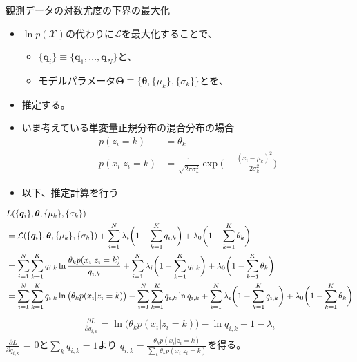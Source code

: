 \documentclass[aspectratio=169,unicode,dvipdfmx,14pt]{beamer}
\begin{document}
\begin{frame}{観測データの対数尤度の下界の最大化}
\begin{itemize}
\item $\ln p(\mathcal{X})$の代わりに$\mathcal{L}$を最大化することで、
\begin{itemize}
\item $\{ \bm{q}_i \} \equiv \{ \bm{q}_1, \ldots, \bm{q}_N \}$と、
\item モデルパラメータ$\bm{\Theta} \equiv \{ \bm{\theta}, \{ \mu_k \}, \{ \sigma_k \} \}$とを、
\end{itemize}
\item[] 推定する。
\item いま考えている単変量正規分布の混合分布の場合
\begin{align}
p(z_i=k) & = \theta_k \\
p(x_i | z_i=k) & = \frac{1}{\sqrt{2\pi\sigma_k^2}} \exp \bigg( - \frac{ ( x_i - \mu_k)^2 }{ 2\sigma_k^2 } \bigg)
\end{align}
\item 以下、推定計算を行う
\end{itemize}
\end{frame}

\begin{frame}
\FontMath
\begin{align}
& L(\{ \bm{q}_i \},\bm{\theta},\{\mu_k\},\{\sigma_k\}) 
\notag \\ &
= \mathcal{L}(\{ \bm{q}_i \},\bm{\theta},\{\mu_k\},\{\sigma_k\})
+ \sum_{i=1}^N \lambda_i \bigg(1 - \sum_{k=1}^K q_{i,k}\bigg)
+ \lambda_0 \bigg( 1 - \sum_{k=1}^K \theta_k \bigg)
\notag \\ &
= \sum_{i=1}^N \sum_{k=1}^K q_{i,k} \ln\frac{\theta_k p(x_i | z_i = k)}{q_{i,k}}
+ \sum_{i=1}^N \lambda_i \bigg(1 - \sum_{k=1}^K q_{i,k}\bigg)
+ \lambda_0 \bigg( 1 - \sum_{k=1}^K \theta_k \bigg)
\notag \\ &
= 
\sum_{i=1}^N \sum_{k=1}^K q_{i,k} \ln \big( \theta_k p(x_i | z_i = k) \big)
- \sum_{i=1}^N \sum_{k=1}^K q_{i,k} \ln q_{i,k}
+ \sum_{i=1}^N \lambda_i \bigg(1 - \sum_{k=1}^K q_{i,k}\bigg)
+ \lambda_0 \bigg( 1 - \sum_{k=1}^K \theta_k \bigg)
\end{align}
\begin{align}
\frac{\partial L}{\partial q_{i,k}}
= \ln \big( \theta_k p(x_i | z_i = k) \big) - \ln q_{i,k} - 1 - \lambda_i
\end{align}
$\frac{\partial L}{\partial q_{i,k}}$ = 0と$\sum_k q_{i,k}=1$より
$q_{i,k} = \frac{ \theta_k p(x_i | z_i = k) }{ \sum_k \theta_k p(x_i | z_i = k) }$を得る。
\end{frame}
\end{document}
